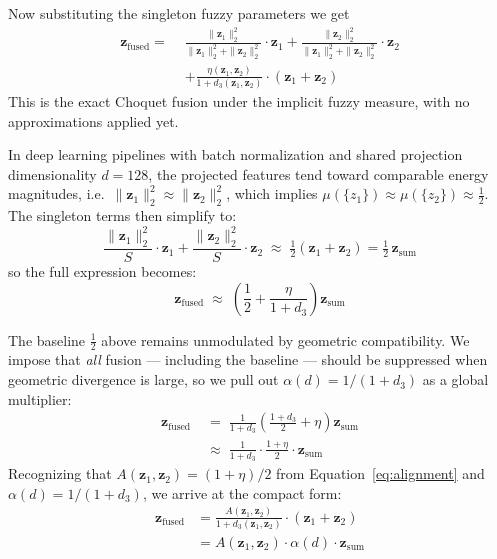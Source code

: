 \documentclass[preprint,12pt]{elsarticle}
\begin{document}
Now substituting the singleton fuzzy parameters we get
\begin{equation*}
\begin{aligned}
    \mathbf{z}_{\text{fused}} = \,\, & 
        \frac{\|\mathbf{z}_1\|_2^2}{\|\mathbf{z}_1\|_2^2 + \|\mathbf{z}_2\|_2^2} \cdot \mathbf{z}_1 + 
        \frac{\|\mathbf{z}_2\|_2^2}{\|\mathbf{z}_1\|_2^2 + \|\mathbf{z}_2\|_2^2} \cdot \mathbf{z}_2
     \\
    & + 
        \frac{\eta(\mathbf{z}_1, \mathbf{z}_2)}{1 + d_3(\mathbf{z}_1, \mathbf{z}_2)} \cdot (\mathbf{z}_1 + \mathbf{z}_2)
\end{aligned}
\end{equation*}
This is the exact Choquet fusion under the implicit fuzzy measure, with no approximations applied yet.

In deep learning pipelines with batch normalization and shared projection dimensionality $d{=}128$, the projected features tend toward comparable energy magnitudes, i.e.\ $\|\mathbf{z}_1\|_2^2 \approx \|\mathbf{z}_2\|_2^2$, which implies $\mu(\{z_1\}) \approx \mu(\{z_2\}) \approx \tfrac{1}{2}$. The singleton terms then simplify to:
\begin{equation*}
    \frac{\|\mathbf{z}_1\|_2^2}{S}\cdot\mathbf{z}_1 + \frac{\|\mathbf{z}_2\|_2^2}{S}\cdot\mathbf{z}_2 \;\approx\; \tfrac{1}{2}(\mathbf{z}_1+\mathbf{z}_2) = \tfrac{1}{2}\,\mathbf{z}_{\text{sum}}
\end{equation*}
so the full expression becomes:
\begin{equation*}
    \mathbf{z}_{\text{fused}} \;\approx\; \left(\frac{1}{2} + \frac{\eta}{1+d_3}\right)\mathbf{z}_{\text{sum}}
\end{equation*}

The baseline $\tfrac{1}{2}$ above remains unmodulated by geometric compatibility. We impose that \emph{all} fusion — including the baseline — should be suppressed when geometric divergence is large, so we pull out $\alpha(d) = 1/(1+d_3)$ as a global multiplier:
\begin{align*}
    \mathbf{z}_{\text{fused}} &\;=\; \frac{1}{1+d_3}\!\left(\frac{1+d_3}{2} + \eta\right)\mathbf{z}_{\text{sum}} \\[6pt]
                               &\;\approx\; \frac{1}{1+d_3}\cdot\frac{1+\eta}{2}\cdot\mathbf{z}_{\text{sum}}
\end{align*}
Recognizing that $A(\mathbf{z}_1,\mathbf{z}_2) = (1+\eta)/2$ from Equation~\eqref{eq:alignment} and $\alpha(d) = 1/(1+d_3)$, we arrive at the compact form:
\begin{equation*}
\begin{aligned}
\mathbf{z}_{\text{fused}} 
&= \frac{A(\mathbf{z}_1,\mathbf{z}_2)}{1+d_3(\mathbf{z}_1,\mathbf{z}_2)}
   \cdot(\mathbf{z}_1+\mathbf{z}_2) \\[4pt]
&= A(\mathbf{z}_1,\mathbf{z}_2)\cdot\alpha(d)\cdot\mathbf{z}_{\text{sum}}
\end{aligned}
\end{equation*}
\end{document}
